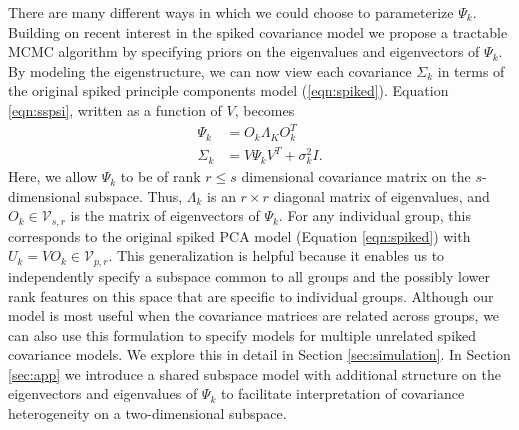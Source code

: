 \documentclass[12pt]{article}
\begin{document}

There are many different ways in which we could choose to parameterize
$\Psi_k$.  Building on recent interest in the spiked covariance model
\citep{Donoho2013, Paul2007} we propose a tractable MCMC algorithm by
specifying priors on the eigenvalues and eigenvectors of $\Psi_k$.  By
modeling the eigenstructure, we can now view each covariance
$\Sigma_k$ in terms of the original spiked principle components model
(\ref{eqn:spiked}).  Equation \ref{eqn:sspsi}, written as a function of
$V$, becomes
%
\begin{align}
\nonumber \Psi_k &= O_k\Lambda_KO_k^T\\
\Sigma_k &= V\Psi_kV^T + \sigma^2_kI.
\label{eqn:ss}
\end{align}
%
\noindent Here, we allow $\Psi_k$ to be of rank $r \leq s$ dimensional
covariance matrix on the $s$-dimensional subspace.  Thus, $\Lambda_k$
is an $r \times r$ diagonal matrix of eigenvalues, and
$O_k \in \mathcal{V}_{s,r}$ is the matrix of eigenvectors of $\Psi_k$.
For any individual group, this corresponds to the original spiked PCA
model (Equation \ref{eqn:spiked}) with
$U_k = VO_k \in \mathcal{V}_{p, r}$.  This generalization is helpful
because it enables us to independently specify a subspace common to
all groups and the possibly lower rank features on this space that are
specific to individual groups.  Although our model is most useful when
the covariance matrices are related across groups, we can also use
this formulation to specify models for multiple unrelated spiked
covariance models.  We explore this in detail in Section
\ref{sec:simulation}.  In Section \ref{sec:app} we introduce a shared
subspace model with additional structure on the eigenvectors and
eigenvalues of $\Psi_k$ to facilitate interpretation of covariance
heterogeneity on a two-dimensional subspace.
\end{document}
